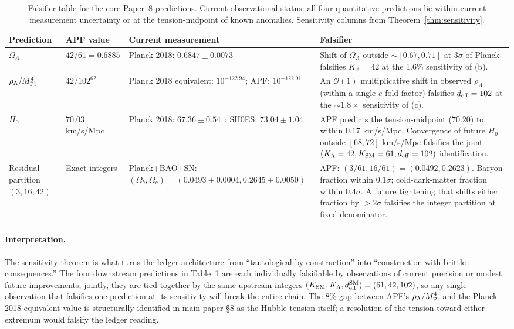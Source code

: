 \documentclass[11pt]{article}
\theoremstyle{plain}
\theoremstyle{definition}
\theoremstyle{remark}
\newcommand{\Mpl}{M_{\rm Pl}}
\begin{document}
\begin{table}[h]
\centering
\small
\setlength{\tabcolsep}{4pt}
\begin{tabularx}{\textwidth}{@{}l l l X@{}}
\toprule
\textbf{Prediction} & \textbf{APF value} & \textbf{Current measurement} & \textbf{Falsifier} \\
\midrule
$\Omega_\Lambda$                & $42/61 = 0.6885$ & Planck 2018: $0.6847 \pm 0.0073$~\cite{Planck2018} & Shift of $\Omega_\Lambda$ outside $\sim [0.67, 0.71]$ at 3$\sigma$ of Planck falsifies $K_\Lambda = 42$ at the 1.6\% sensitivity of (b). \\
\addlinespace[3pt]
$\rho_\Lambda / \Mpl^4$          & $42/102^{62}$    & Planck 2018 equivalent: $10^{-122.94}$; APF: $10^{-122.91}$ & An $\mathcal{O}(1)$ multiplicative shift in observed $\rho_\Lambda$ (within a single $e$-fold factor) falsifies $d_{\rm eff} = 102$ at the $\sim 1.8\times$ sensitivity of (c). \\
\addlinespace[3pt]
$H_0$                           & $70.03$ km/s/Mpc & Planck 2018: $67.36 \pm 0.54$~\cite{Planck2018}; SH0ES: $73.04 \pm 1.04$~\cite{Riess2022} & APF predicts the tension-midpoint ($70.20$) to within $0.17$ km/s/Mpc.  Convergence of future $H_0$ outside $[68, 72]$ km/s/Mpc falsifies the joint $(K_\Lambda = 42, K_{\rm SM} = 61, d_{\rm eff} = 102)$ identification. \\
\addlinespace[3pt]
Residual partition $(3, 16, 42)$ & Exact integers  & Planck+BAO+SN: $(\Omega_b, \Omega_c) = (0.0493 \pm 0.0004, 0.2645 \pm 0.0050)$ & APF: $(3/61, 16/61) = (0.0492, 0.2623)$.  Baryon fraction within $0.1\sigma$; cold-dark-matter fraction within $0.4\sigma$.  A future tightening that shifts either fraction by $> 2\sigma$ falsifies the integer partition at fixed denominator. \\
\bottomrule
\end{tabularx}
\caption{Falsifier table for the core Paper~8 predictions.  Current observational status: all four quantitative predictions lie within current measurement uncertainty or at the tension-midpoint of known anomalies.  Sensitivity columns from Theorem~\ref{thm:sensitivity}.}\label{tab:falsifiers}
\end{table}

\paragraph{Interpretation.}  The sensitivity theorem is what turns the ledger architecture from ``tautological by construction'' into ``construction with brittle consequences.''  The four downstream predictions in Table~\ref{tab:falsifiers} are each individually falsifiable by observations of current precision or modest future improvements; jointly, they are tied together by the same upstream integers $(K_{\rm SM}, K_\Lambda, d_{\rm eff}^{\rm SM}) = (61, 42, 102)$, so any single observation that falsifies one prediction at its sensitivity will break the entire chain.  The 8\% gap between APF's $\rho_\Lambda/\Mpl^4$ and the Planck-2018-equivalent value is structurally identified in main paper \S8 as the Hubble tension itself; a resolution of the tension toward either extremum would falsify the ledger reading.
\end{document}
